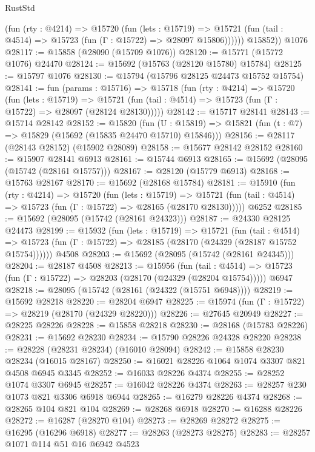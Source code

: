 \begin{lexlean}{RustStd}
\begin{coremodule}
            (fun (rty : @4214) =>
            @15720
              (fun (lets : @15719) =>
              @15721 (fun (tail : @4514) => @15723 (fun (Γ : @15722) => @28097 @15806))))))
        @15852))
    @1076
@28117 := @15858 (@28090 (@15709 @1076))
@28120 := @15771 (@15772 @1076) @24470
@28124 := @15692 (@15763 (@28120 @15780) @15784)
@28125 := @15797 @1076
@28130 := @15794 (@15796 @28125 @24473 @15752 @15754)
@28141 := fun (params : @15716) =>
  @15718
    (fun (rty : @4214) =>
    @15720
      (fun (lets : @15719) =>
      @15721 (fun (tail : @4514) => @15723 (fun (Γ : @15722) => @28097 (@28124 @28130)))))
@28142 := @15717 @28141
@28143 := @15714 @28142
@28152 := @15820
    (fun (U : @15819) => @15821 (fun (t : @7) => @15829 (@15692 (@15835 @24470 @15710) @15846)))
@28156 := @28117 (@28143 @28152) (@15902 @28089)
@28158 := @15677 @28142 @28152
@28160 := @15907 @28141 @6913
@28161 := @15744 @6913
@28165 := @15692 (@28095 (@15742 (@28161 @15757)))
@28167 := @28120 (@15779 @6913)
@28168 := @15763 @28167
@28170 := @15692 (@28168 @15784)
@28181 := @15910
    (fun (rty : @4214) =>
    @15720
      (fun (lets : @15719) =>
      @15721 (fun (tail : @4514) => @15723 (fun (Γ : @15722) => @28165 (@28170 @28130)))))
    @6252
@28185 := @15692 (@28095 (@15742 (@28161 @24323)))
@28187 := @24330 @28125 @24473
@28199 := @15932
    (fun (lets : @15719) =>
    @15721
      (fun (tail : @4514) =>
      @15723 (fun (Γ : @15722) => @28185 (@28170 (@24329 (@28187 @15752 @15754))))))
    @4508
@28203 := @15692 (@28095 (@15742 (@28161 @24345)))
@28204 := @28187 @4508
@28213 := @15956
    (fun (tail : @4514) => @15723 (fun (Γ : @15722) => @28203 (@28170 (@24329 (@28204 @15754)))))
    @6947
@28218 := @28095 (@15742 (@28161 (@24322 (@15751 @6948))))
@28219 := @15692 @28218
@28220 := @28204 @6947
@28225 := @15974 (fun (Γ : @15722) => @28219 (@28170 (@24329 @28220)))
@28226 := @27645 @20949
@28227 := @28225 @28226
@28228 := @15858 @28218
@28230 := @28168 (@15783 @28226)
@28231 := @15692 @28230
@28234 := @15790 @28226 @24328 @28220
@28238 := @28228 (@28231 @28234) (@16010 @28094)
@28242 := @15858 @28230 @28234 (@16015 @28167)
@28250 := @16021 @28226 @1064 @1074 @3307 @821 @4508 @6945 @3345
@28252 := @16033 @28226 @4374
@28255 := @28252 @1074 @3307 @6945
@28257 := @16042 @28226 @4374
@28263 := @28257 @230 @1073 @821 @3306 @6918 @6944
@28265 := @16279 @28226 @4374
@28268 := @28265 @104 @821 @104
@28269 := @28268 @6918
@28270 := @16288 @28226
@28272 := @16287 (@28270 @104)
@28273 := @28269 @28272
@28275 := @16295 (@16296 @6918)
@28277 := @28263 (@28273 @28275)
@28283 := @28257 @1071 @114 @51 @16 @6942 @4523

\end{coremodule}
\end{lexlean}

